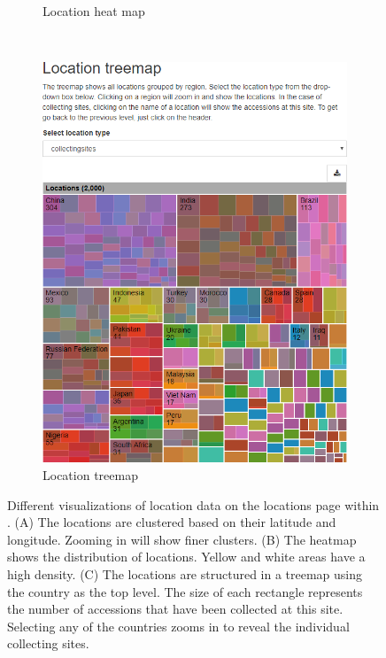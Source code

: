 \begin{figure}
\begin{subfigure}[b]{0.315\linewidth}
		\caption{Location heat map}
		\label{fig:features:locations-heatmapped}
	\end{subfigure}
	~
	\begin{subfigure}[b]{0.315\linewidth}
		\includegraphics[width=1\linewidth]{img/features/locations-treemapped.png}
		\caption{Location treemap}
		\label{fig:features:locations-treemapped}
	\end{subfigure}
	\caption{Different visualizations of location data on the locations page within {\germinate}. (A) The locations are clustered based on their latitude and longitude. Zooming in will show finer clusters. (B) The heatmap shows the distribution of locations. Yellow and white areas have a high density. (C) The locations are structured in a treemap using the country as the top level. The size of each rectangle represents the number of accessions that have been collected at this site. Selecting any of the countries zooms in to reveal the individual collecting sites.}
	\label{fig:features:locations}
\end{figure}

